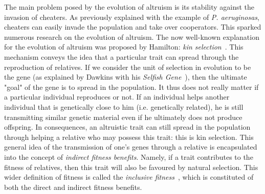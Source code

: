     The main problem posed by the evolution of altruism is its stability against the invasion of cheaters. As previously explained with the example of \emph{P. aeruginosas}, cheaters can easily invade the population and take over cooperators. This sparked numerous research on the evolution of altruism. The now well-known explanation for the evolution of altruism was proposed by Hamilton: \emph{kin selection}~\parencite{Hamilton1964}. This mechanism conveys the idea that a particular trait can spread through the reproduction of relatives. If we consider the unit of selection in evolution to be the gene (as explained by Dawkins with his \emph{Selfish Gene}~\parencite{Dawkins1976}), then the ultimate "goal" of the gene is to spread in the population. It thus does not really matter if a particular individual reproduces or not. If an individual helps another individual that is genetically close to him (i.e. genetically related), he is still transmitting similar genetic material even if he ultimately does not produce offspring. In consequences, an altruistic trait can still spread in the population through helping a relative who may possess this trait: this is kin selection. This general idea of the transmission of one's genes through a relative is encapsulated into the concept of \emph{indirect fitness benefits}. Namely, if a trait contributes to the fitness of relatives, then this trait will also be favoured by natural selection. This wider definition of fitness is called the \emph{inclusive fitness}~\parencite{Grafen1984}, which is constituted of both the direct and indirect fitness benefits.






